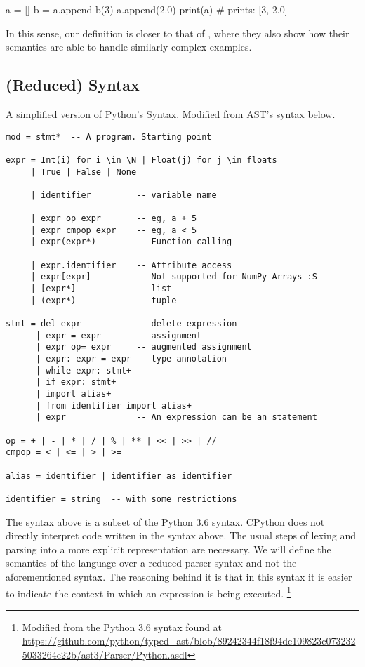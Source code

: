 \begin{pythoncode}
a = []
b = a.append
b(3)
a.append(2.0)
print(a)  # prints: [3, 2.0]
\end{pythoncode}

In this sense, our definition is closer to that of \textcite{politz_python_2013}, where
they also show how their semantics are able to handle similarly complex examples.

\subsection{(Reduced) Syntax}\label{reduced-syntax}

A simplified version of Python's Syntax. Modified from AST's syntax below.


\begin{verbatim}
mod = stmt*  -- A program. Starting point

expr = Int(i) for i \in \N | Float(j) for j \in floats
     | True | False | None

     | identifier         -- variable name

     | expr op expr       -- eg, a + 5
     | expr cmpop expr    -- eg, a < 5
     | expr(expr*)        -- Function calling

     | expr.identifier    -- Attribute access
     | expr[expr]         -- Not supported for NumPy Arrays :S
     | [expr*]            -- list
     | (expr*)            -- tuple

stmt = del expr           -- delete expression
      | expr = expr       -- assignment
      | expr op= expr     -- augmented assignment
      | expr: expr = expr -- type annotation
      | while expr: stmt+
      | if expr: stmt+
      | import alias+
      | from identifier import alias+
      | expr              -- An expression can be an statement

op = + | - | * | / | % | ** | << | >> | //
cmpop = < | <= | > | >=

alias = identifier | identifier as identifier

identifier = string  -- with some restrictions
\end{verbatim}

The syntax above is a subset of the Python 3.6 syntax. CPython does not directly interpret
code written in the syntax above. The usual steps of lexing and parsing into a more
explicit representation are necessary. We will define the semantics of the language over a
reduced parser syntax and not the aforementioned syntax. The reasoning behind it is that
in this syntax it is easier to indicate the context in which an expression is being
executed. \footnote{Modified from the Python 3.6 syntax found at
\url{https://github.com/python/typed_ast/blob/89242344f18f94dc109823c0732325033264e22b/ast3/Parser/Python.asdl}}

